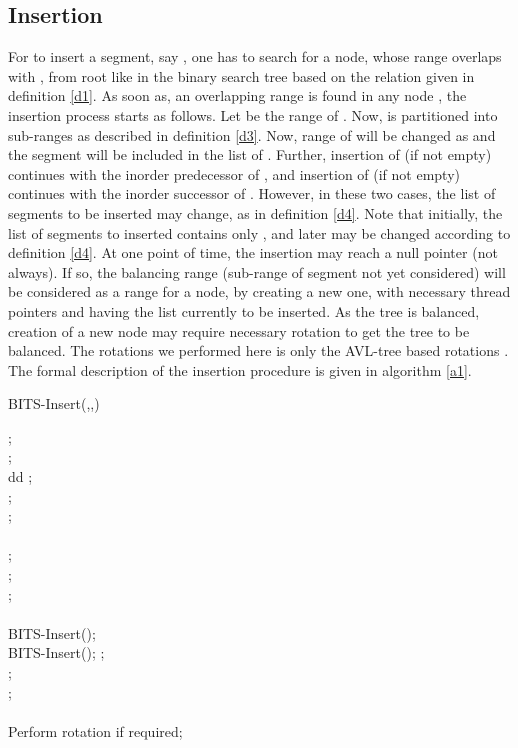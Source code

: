 \documentclass{article}
\begin{document}
\subsection{Insertion}
For to insert a segment, say , one has to search for a node, whose range overlaps with , from root like in the binary search tree based on the relation given in definition \ref{d1}. As soon as, an overlapping range is found in any node , the insertion process starts as follows. Let  be the range of . Now,  is partitioned into sub-ranges as described in definition \ref{d3}. Now, range of  will be changed as  and the segment  will be included in the list of . Further, insertion of  (if not empty) continues with the inorder predecessor of , and insertion of  (if not empty) continues with the inorder successor of . However, in these two cases, the list of segments to be inserted may change, as in definition \ref{d4}. Note that initially, the list of segments to inserted contains only , and later may be changed according to definition \ref{d4}. At one point of time, the insertion may reach a null pointer (not always). If so, the balancing range (sub-range of segment not yet considered) will be considered as a range for a node, by creating a new one, with necessary thread pointers and having the list currently to be inserted. As the tree is balanced, creation of a new node may require necessary rotation to get the tree to be balanced. The rotations we performed here is only the AVL-tree based rotations \cite{avl}. The formal description of the insertion procedure is given in algorithm \ref{a1}.
\begin{algorithm}
\caption{BITS-Insert(,,)}\label{a1}
\hspace{-3mm};\\
;\\
{
  {
dd     \hspace{-3mm};\\
     ;\\
     ;\\
     \If{}
     {
        \hspace{-3mm}\lIf{}{;}\\
        \lElse{;}
     } 
  }
  \If {}
  {
    \hspace{-3mm};\\
    ;\\
    ;\\
    \If {}
    {
       \hspace{-3mm}\lIf{}{;}\\
       BITS-Insert();
    }
    \If {}
    {
       \hspace{-3mm}\lIf{}{;}\\
       BITS-Insert();
    }
  }
}
{
   \hspace{-3mm};\\
   ; \\
   ;\\
   \If{}
   {
     \hspace{-3mm}\lIf{}{;}\\
     \lElse{;}
   }
   Perform rotation if required;
}
\end{algorithm}
\end{document}
